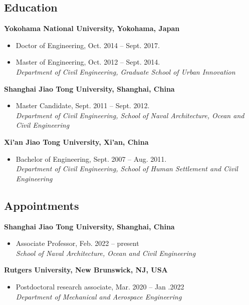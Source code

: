 \documentclass[10pt]{article}
\newenvironment{myitemize}
{ \begin{itemize}
    \setlength{\itemsep}{0pt}
    \setlength{\parskip}{0pt}
    \setlength{\parsep}{0pt}     }
{ \end{itemize}                  }
\begin{document}
\subsection*{Education}

 {\bf\color{Blue} Yokohama National University, Yokohama, Japan}		
\begin{myitemize}
\item Doctor of Engineering, Oct. 2014 -- Sept. 2017.
\item Master of Engineering, Oct. 2012 -- Sept. 2014.\\
\textit{Department of Civil Engineering, Graduate School of Urban Innovation}
\end{myitemize}

{\bf\color{Blue} Shanghai Jiao Tong University, Shanghai, China}
\begin{myitemize}
\item Master Candidate, Sept. 2011 -- Sept. 2012.\\
\textit{Department of Civil Engineering, School of Naval Architecture, Ocean and Civil Engineering}
\end{myitemize}

{\bf\color{Blue} Xi'an Jiao Tong University, Xi'an, China}
\begin{myitemize}
\item Bachelor of Engineering, Sept. 2007 -- Aug. 2011.\\
\textit{Department of Civil Engineering, School of Human Settlement and Civil Engineering}
\end{myitemize}

\subsection*{Appointments}

{\bf \color{Blue} Shanghai Jiao Tong University, Shanghai, China} 
\begin{myitemize}
\item Associate Professor, Feb. 2022 -- present \\
{\em School of Naval Architecture, Ocean and Civil Engineering}
\end{myitemize}

{\bf \color{Blue} Rutgers University, New Brunswick, NJ, USA} 
\begin{myitemize}
\item  Postdoctoral research associate, Mar. 2020 -- Jan .2022\\
{\em Department of Mechanical and Aerospace Engineering}
\end{myitemize}
\end{document}
